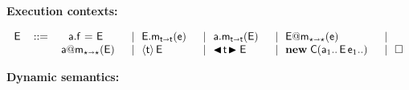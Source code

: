 \documentclass[USenglish]{tex/lipics-v2016}
\begin{document}
\begin{figure}[!h]
\begin{mathpar}



\end{mathpar}


\vspace{4mm}
{\bf Execution contexts:}
\vspace{-2mm}

\[
\begin{tabular}{llllllllllllllllll}
\EE &::=& ~ \FWriteR\a\f\EE   &\B  
        \KCall\EE\m\e\t\t  &\B
        \KCall\a\m{\EE}\t\t &\B
        \DynCall\EE\m\e   &\B\\
&       & \DynCall\a\m\EE   &\B
       \SubCast\t\EE  &\B
      \BehCast\t\EE  &\B
       \New\C{\a[1]..\,\EE\,\e[1]..} &\B 
      \EM{\square}
\end{tabular}
\]

\vspace{4mm}
{\bf Dynamic semantics:}
\vspace{2mm}

\hspace{7mm}\begin{minipage}{\textwidth}


\end{minipage}
\end{figure}
\end{document}
